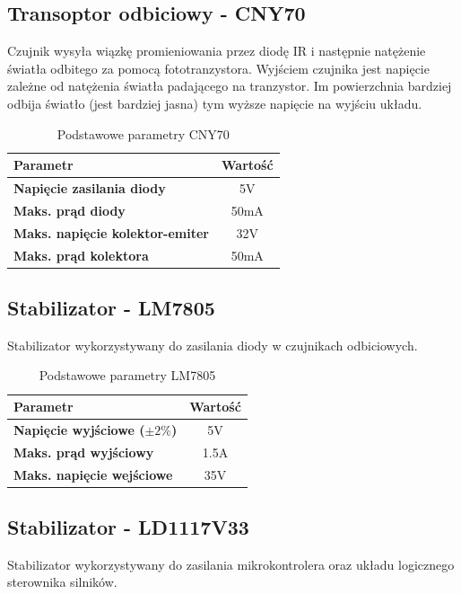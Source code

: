 \documentclass[10pt, a4paper]{article}
\begin{document}
\subsection{Transoptor odbiciowy - CNY70}
\noindent Czujnik wysyła wiązkę promieniowania przez diodę IR i następnie natężenie światła odbitego za pomocą fototranzystora. Wyjściem czujnika jest napięcie zależne od natężenia światła padającego na tranzystor. Im powierzchnia bardziej odbija światło (jest bardziej jasna) tym wyższe napięcie na wyjściu układu. 

\begin{table}[H]
	\centering
	\begin{tabular}{|l|c|} \hline
		\textbf{Parametr} & Wartość \\
		\hline
		\hline  \textbf{Napięcie zasilania diody}& 5V\\\hline
		\textbf{Maks. prąd diody} & 50mA\\
		\hline
		\textbf{Maks. napięcie kolektor-emiter} & 32V\\
		\hline
		\textbf{Maks. prąd kolektora} & 50mA\\
		\hline
	\end{tabular}
	\caption{Podstawowe parametry CNY70}
	\label{tab:CNY70}
\end{table}

\subsection{Stabilizator - LM7805}
\noindent Stabilizator wykorzystywany do zasilania diody w czujnikach odbiciowych. 

\begin{table}[H]
	\centering
	\begin{tabular}{|l|c|} \hline
		\textbf{Parametr} & Wartość \\
		\hline
		\hline  \textbf{Napięcie wyjściowe ($\pm 2\%$)}& 5V\\\hline
		\textbf{Maks. prąd wyjściowy} & 1.5A\\
		\hline
		\textbf{Maks. napięcie wejściowe} & 35V\\
		\hline
	\end{tabular}
	\caption{Podstawowe parametry LM7805}
	\label{tab:LM7805}
\end{table}

\subsection{Stabilizator - LD1117V33}
\noindent Stabilizator wykorzystywany do zasilania mikrokontrolera oraz układu logicznego sterownika silników.
\end{document}
